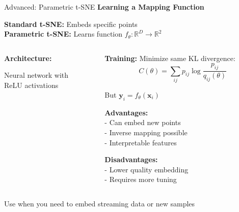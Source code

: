 \documentclass[10pt]{beamer}
\newcommand{\emphtext}[1]{\textcolor{upcblue}{\textbf{#1}}}
\newcommand{\conceptbox}[1]{\colorbox{upcblue!10}{\begin{minipage}{0.85\textwidth}\centering #1\end{minipage}}}
\begin{document}
\begin{frame}{Advanced: Parametric t-SNE}
\emphtext{Learning a Mapping Function}

\vspace{0.3cm}
\textbf{Standard t-SNE:} Embeds specific points\\
\textbf{Parametric t-SNE:} Learns function $f_\theta: \mathbb{R}^D \rightarrow \mathbb{R}^2$

\vspace{0.3cm}
\begin{columns}[T]
\begin{column}{0.48\textwidth}
\textbf{Architecture:}
\footnotesize
{}

\footnotesize
Neural network with\\
ReLU activations
\end{column}

\begin{column}{0.48\textwidth}
\textbf{Training:}
\footnotesize
Minimize same KL divergence:\\
$$C(\theta) = \sum_{ij} p_{ij} \log\frac{p_{ij}}{q_{ij}(\theta)}$$

But $\mathbf{y}_i = f_\theta(\mathbf{x}_i)$

\vspace{0.2cm}
\textbf{Advantages:}\\
- Can embed new points\\
- Inverse mapping possible\\
- Interpretable features

\textbf{Disadvantages:}\\
- Lower quality embedding\\
- Requires more tuning
\end{column}
\end{columns}

\vspace{0.3cm}
\begin{center}
\conceptbox{\footnotesize Use when you need to embed streaming data or new samples}
\end{center}
\end{frame}
\end{document}
